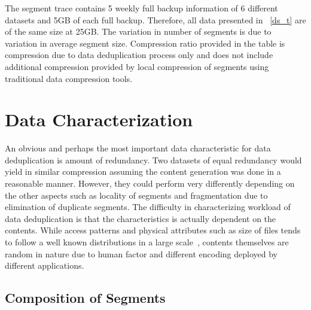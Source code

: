 The segment trace contains 5 weekly full backup information of 6 different datasets and 5GB of each full backup. Therefore, all data presented in \tablename~\ref{ds_t} are of the same size at 25GB. The variation in number of segments is due to variation in average segment size. Compression ratio provided in the table is compression due to data deduplication process only and does not include additional compression provided by local compression of segments using traditional data compression tools. 



\section{Data Characterization}\label{result}

An obvious and perhaps the most important data characteristic for data deduplication is amount of redundancy. Two datasets of equal redundancy would yield in similar compression assuming the content generation was done in a reasonable manner. However, they could perform very differently depending on the other aspects such as locality of segments and fragmentation due to elimination of duplicate segments. The difficulty in characterizing workload of data deduplication is that the characteristics is actually dependent on the contents. While access patterns and physical attributes such as size of files tends to follow a well known distributions in a large scale~\cite{riska:2009, leung:2008}, contents themselves are random in nature due to human factor and different encoding deployed by different applications.

\subsection {Composition of Segments}

